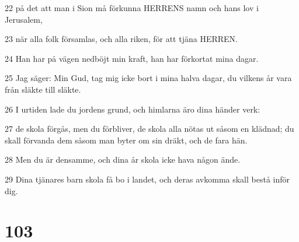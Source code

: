 \par 22 på det att man i Sion må förkunna HERRENS namn och hans lov i Jerusalem,
\par 23 när alla folk församlas, och alla riken, för att tjäna HERREN.
\par 24 Han har på vägen nedböjt min kraft, han har förkortat mina dagar.
\par 25 Jag säger: Min Gud, tag mig icke bort i mina halva dagar, du vilkens år vara från släkte till släkte.
\par 26 I urtiden lade du jordens grund, och himlarna äro dina händer verk:
\par 27 de skola förgås, men du förbliver, de skola alla nötas ut såsom en klädnad; du skall förvanda dem såsom man byter om sin dräkt, och de fara hän.
\par 28 Men du är densamme, och dina år skola icke hava någon ände.
\par 29 Dina tjänares barn skola få bo i landet, och deras avkomma skall bestå inför dig.

\chapter{103}

